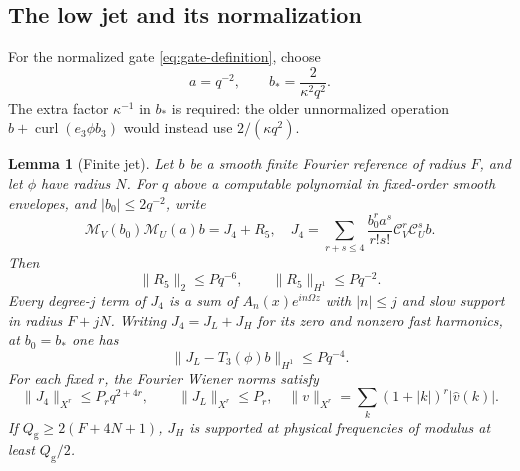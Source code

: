 \documentclass[11pt,a4paper]{amsart}
\newtheorem{lemma}[theorem]{Lemma}
\theoremstyle{definition}
\theoremstyle{remark}
\numberwithin{equation}{section}
\newcommand{\Ccal}{\mathcal C}
\newcommand{\Mcal}{\mathcal M}
\newcommand{\norm}[1]{\lVert #1\rVert}
\newcommand{\curl}{\operatorname{curl}}
\begin{document}
\subsection{The low jet and its normalization}

For the normalized gate \eqref{eq:gate-definition}, choose
\begin{equation}\label{eq:packet-impulses}
 a=q^{-2},\qquad b_*=\frac{2}{\kappa^2q^2}.
\end{equation}
The extra factor $\kappa^{-1}$ in $b_*$ is required: the older unnormalized
operation $b+\curl(e_3\phi b_3)$ would instead use $2/(\kappa q^2)$.

\begin{lemma}[Finite jet]\label{lem:packet-jet}
Let $b$ be a smooth finite Fourier reference of radius $F$, and let $\phi$
have radius $N$.  For $q$ above a computable polynomial in fixed-order smooth
envelopes, and $|b_0|\le2q^{-2}$, write
\begin{equation}\label{eq:packet-jet-expansion}
 \Mcal_V(b_0)\Mcal_U(a)b
 =J_4+R_5,
 \quad
 J_4=\sum_{r+s\le4}\frac{b_0^ra^s}{r!s!}\Ccal_V^r\Ccal_U^sb.
\end{equation}
Then
\begin{equation}\label{eq:packet-remainder}
 \norm{R_5}_2\le Pq^{-6},\qquad
 \norm{R_5}_{H^1}\le Pq^{-2}.
\end{equation}
Every degree-$j$ term of $J_4$ is a sum of
$A_n(x)e^{in\Omega z}$ with $|n|\le j$ and slow support in radius $F+jN$.
Writing $J_4=J_L+J_H$ for its zero and nonzero fast harmonics, at $b_0=b_*$
one has
\begin{equation}\label{eq:packet-low-term}
 \norm{J_L-T_3(\phi)b}_{H^1}\le Pq^{-4}.
\end{equation}
For each fixed $r$, the Fourier Wiener norms satisfy
\begin{equation}\label{eq:packet-wiener-envelope}
 \norm{J_4}_{X^r}\le P_rq^{2+4r},\qquad
 \norm{J_L}_{X^r}\le P_r,
 \quad
 \norm v_{X^r}=\sum_k(1+|k|)^r|\widehat v(k)|.
\end{equation}
If $Q_{\mathrm g}\ge2(F+4N+1)$, $J_H$ is supported at physical frequencies of modulus
at least $Q_{\mathrm g}/2$.
\end{lemma}
\end{document}
